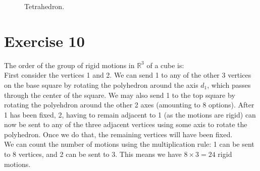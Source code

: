 \documentclass[12pt]{article}
\newcommand{\R}{\mathbb{R}}
\begin{document}
\begin{figure}[H]

        \caption{\label{fig:figure1} Tetrahedron.}
    \end{figure}


    \section*{Exercise 10}
    The order of the group of rigid motions in $\R^3$ of a cube is: \\
    First consider the vertices 1 and 2.
    We can send 1 to any of the other 3 vertices on the base square by
    rotating the polyhedron around the axis $d_1$, which passes through
    the center of the square. We may also send 1 to the top square by
    rotating the polyehdron around the other 2 axes (amounting to 8 options).
    After 1 has been fixed, 2, having to remain adjacent to 1 (as the
    motions are rigid) can now be sent to any of the three adjacent vertices
    using some axis to rotate the polyhedron. Once we do that, the
    remaining vertices will have been fixed. \\
    We can count the number of motions using the multiplication rule:
    1 can be sent to 8 vertices, and 2 can be sent to 3. This means we
    have $8 \times 3 = 24$ rigid motions. 
\end{document}
